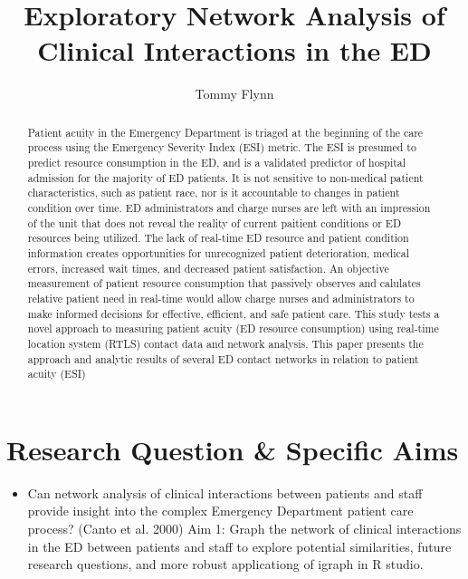 \documentclass[]{elsarticle} %
\providecommand{\tightlist}{%
  \setlength{\itemsep}{0pt}\setlength{\parskip}{0pt}}
\begin{document}
\begin{frontmatter}

  \title{Exploratory Network Analysis of Clinical Interactions in the ED}
    \author[Emory University]{Tommy Flynn}
      \address[Emory University]{Repository
(\url{https://github.com/tommyflynn/Flynn_N741_Project/tree/master/Flynn_Project})}
  
  \begin{abstract}
  Patient acuity in the Emergency Department is triaged at the beginning
  of the care process using the Emergency Severity Index (ESI) metric. The
  ESI is presumed to predict resource consumption in the ED, and is a
  validated predictor of hospital admission for the majority of ED
  patients. It is not sensitive to non-medical patient characteristics,
  such as patient race, nor is it accountable to changes in patient
  condition over time. ED administrators and charge nurses are left with
  an impression of the unit that does not reveal the reality of current
  paitient conditions or ED resources being utilized. The lack of
  real-time ED resource and patient condition information creates
  opportunities for unrecognized patient deterioration, medical errors,
  increased wait times, and decreased patient satisfaction. An objective
  measurement of patient resource consumption that passively observes and
  calulates relative patient need in real-time would allow charge nurses
  and administrators to make informed decisions for effective, efficient,
  and safe patient care. This study tests a novel approach to measuring
  patient acuity (ED resource consumption) using real-time location system
  (RTLS) contact data and network analysis. This paper presents the
  approach and analytic results of several ED contact networks in relation
  to patient acuity (ESI)
  \end{abstract}
  
 \end{frontmatter}

\section{Research Question \& Specific
Aims}\label{research-question-specific-aims}

\begin{itemize}
\tightlist
\item
  Can network analysis of clinical interactions between patients and
  staff provide insight into the complex Emergency Department patient
  care process? (Canto et al. 2000) Aim 1: Graph the network of clinical
  interactions in the ED between patients and staff to explore potential
  similarities, future research questions, and more robust applicationg
  of igraph in R studio.
\end{itemize}
\end{document}
